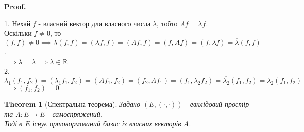 \documentclass[a4paper, 10pt]{article}
\makeatletter
\def\qed{$\blacksquare$}
\theoremstyle{theoremdd}
\newtheorem{theorem}{Theorem}[subsection]
\theoremstyle{theoremdd}
\theoremstyle{theoremdd}
\theoremstyle{theoremdd}
\theoremstyle{theoremdd}
\theoremstyle{theoremdd}
\theoremstyle{theoremdd}
\theoremstyle{theoremdd}
\renewenvironment{proof}[1][Proof.\\]{\par
\pushQED{\hfill \qed}%
\normalfont \topsep6\p@\@plus6\p@\relax
\trivlist
\item\relax
{\bfseries
#1\@addpunct{.}}\hspace\labelsep\ignorespaces
}{%
\popQED\endtrivlist\@endpefalse
}
\makeatother
\begin{document}
\begin{proof}
1. Нехай $f$ - власний вектор для власного числа $\lambda$, тобто $Af = \lambda f$.\\
Оскільки $f \neq 0$, то $(f,f) \neq 0 \implies \lambda (f,f) = (\lambda f, f) = (Af,f) = (f,Af) = (f, \lambda f) = \overline{\lambda} (f,f)$.\\
$\implies \lambda = \overline{\lambda} \implies \lambda \in \mathbb{R}$.
\bigskip \\
2. $\lambda_1 (f_1,f_2) = (\lambda_1 f_1, f_2) = (Af_1, f_2) = (f_2, Af_1) = (f_1, \lambda_2 f_2) = \overline{\lambda_2} (f_1,f_2) = \lambda_2 (f_1,f_2)$\\
$\implies (f_1,f_2) = 0$
\end{proof}

\begin{theorem}[Спектральна теорема]
Задано $(E,(\cdot,\cdot))$ - евклідовий простір та $A: E \to E$ - самоспряжений.\\
Тоді в $E$ існує ортонормований базис із власних векторів $A$.
\end{theorem}
\end{document}
